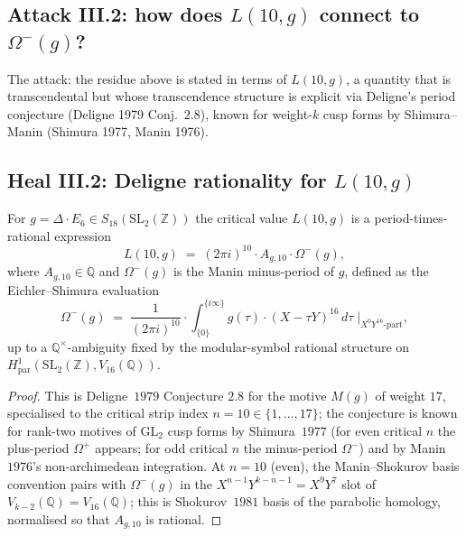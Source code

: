 \subsection*{Attack III.2: how does $L(10, g)$ connect to $\Omega^-(g)$?}

The attack: the residue above is stated in terms of $L(10, g)$, a
quantity that is transcendental but whose transcendence structure is
explicit via Deligne's period conjecture (Deligne 1979 Conj.~$2.8$),
known for weight-$k$ cusp forms by Shimura--Manin (Shimura 1977,
Manin 1976).

\subsection*{Heal III.2: Deligne rationality for $L(10, g)$}

\begin{proposition}[Deligne rationality at $s = 10$]
\label{prop:deligne-rationality-L10g}
For $g = \Delta \cdot E_6 \in S_{18}(\mathrm{SL}_2(\mathbb{Z}))$ the
critical value $L(10, g)$ is a period-times-rational expression
\[
 L(10, g) \;=\; (2 \pi i)^{10} \cdot A_{g, 10} \cdot \Omega^-(g),
\]
where $A_{g, 10} \in \mathbb{Q}$ and $\Omega^-(g)$ is the Manin
minus-period of $g$, defined as the Eichler--Shimura evaluation
\[
 \Omega^-(g) \;=\; \frac{1}{(2 \pi i)^{10}} \cdot \int_{\{0\}}^{\{i\infty\}}
 g(\tau) \cdot (X - \tau Y)^{16}\,d\tau \;\Big|_{X^0 Y^{16}\text{-part}},
\]
up to a $\mathbb{Q}^\times$-ambiguity fixed by the modular-symbol
rational structure on $H^1_{\mathrm{par}}(\mathrm{SL}_2(\mathbb{Z}), V_{16}(\mathbb{Q}))$.
\end{proposition}

\begin{proof}
This is Deligne~$1979$ Conjecture $2.8$ for the motive $M(g)$ of
weight $17$, specialised to the critical strip index $n = 10 \in
\{1, \ldots, 17\}$; the conjecture is known for rank-two motives
of $\mathrm{GL}_2$ cusp forms by Shimura~$1977$ (for even critical
$n$ the plus-period $\Omega^+$ appears; for odd critical $n$ the
minus-period $\Omega^-$) and by Manin~$1976$'s non-archimedean
integration.  At $n = 10$ (even), the Manin--Shokurov basis
convention pairs with $\Omega^-(g)$ in the $X^{n - 1} Y^{k - n - 1}
= X^9 Y^7$ slot of $V_{k - 2}(\mathbb{Q}) = V_{16}(\mathbb{Q})$;
this is Shokurov~$1981$ basis of the parabolic homology, normalised
so that $A_{g, 10}$ is rational.
\end{proof}

